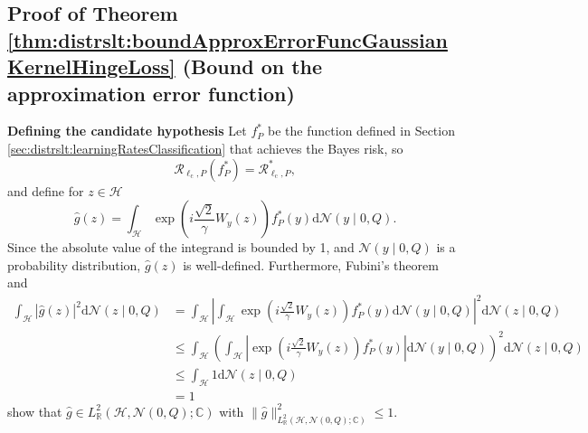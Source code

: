 \documentclass[letterpaper]{article} %
\newcommand{\R}{\mathbb{R}}
\newcommand{\hs}[1]{\mathcal{#1}} %
\newcommand{\risk}{\mathcal{R}} %
\newcommand{\Risk}[2]{\risk_{{#1},{#2}}} %
\newcommand{\RiskBayes}[2]{\risk_{{#1},{#2}}^\ast} %
\newcommand{\Normal}{\mathcal{N}}
\newcommand{\C}{\mathbb{C}}
\newcommand{\ellClass}{\ell_{\mathrm{c}}} %
\begin{document}
\subsection{Proof of Theorem \ref{thm:distrslt:boundApproxErrorFuncGaussianKernelHingeLoss} (Bound on the approximation error function)} 
\label{sec:distrslt:proofOfboundApproxErrorFuncGaussianKernelHingeLoss}
\textbf{Defining the candidate hypothesis}
Let $f_P^\ast$ be the function defined in Section \ref{sec:distrslt:learningRatesClassification} that achieves the Bayes risk, so
\begin{equation*}
    \Risk{\ellClass}{P}(f_P^\ast) = \RiskBayes{\ellClass}{P},
\end{equation*}
and define for $z\in \hs{H}$
\begin{equation}
    \hat g(z) = \int_\hs{H} \exp\left(i \frac{\sqrt{2}}{\gamma} W_y(z)\right) f_P^\ast(y) \mathrm{d}\Normal(y\mid 0,Q).
\end{equation}
Since the absolute value of the integrand is bounded by 1, and $\Normal(y\mid 0,Q)$ is a probability distribution, $\hat g(z)$ is well-defined.
Furthermore, Fubini's theorem and
\begin{align*}
    \int_{\hs{H}} |\hat g(z)|^2 \mathrm{d}\Normal(z\mid 0,Q) 
    & =  \int_{\hs{H}} \left|
        \int_\hs{H} \exp\left(i \frac{\sqrt{2}}{\gamma} W_y(z)\right) f_P^\ast(y) \mathrm{d}\Normal(y\mid 0,Q)
        \right|^2\mathrm{d}\Normal(z\mid 0,Q) \\
    & \leq \int_{\hs{H}} \left(
        \int_\hs{H} |\exp\left(i \frac{\sqrt{2}}{\gamma} W_y(z)\right) f_P^\ast(y)| \mathrm{d}\Normal(y\mid 0,Q)
        \right)^2\mathrm{d}\Normal(z\mid 0,Q) \\
    & \leq \int_{\hs{H}} 1 \mathrm{d}\Normal(z\mid 0,Q) \\
    & = 1
\end{align*}
show that $\hat g \in L^2_\R(\hs{H},\Normal(0,Q);\C)$ with $\|\hat g\|_{L^2_\R(\hs{H},\Normal(0,Q);\C)}^2 \leq 1$.
\end{document}

